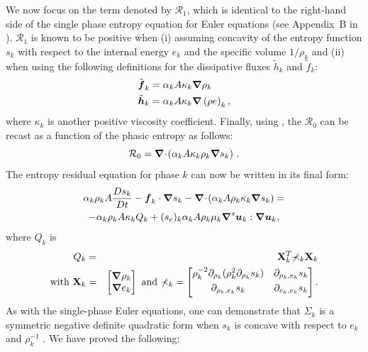We now focus on the term denoted by $\mathcal{R}_1$, which is identical to the right-hand side of the single phase entropy 
equation for Euler equations (see Appendix~B in \cite{Marco_paper_low_mach}). $\mathcal{R}_1$ is known to be positive when 
(i) assuming concavity of the entropy function $s_k$ with respect to the internal energy $e_k$ and the specific 
volume $1 / \rho_k$ and (ii) when using the following definitions for the dissipative fluxes $\tilde{h}_k$ and $\tilde{f}_k$:
%
\begin{subequations} \label{eq:def_visc}
\begin{align}
&\tilde{\boldsymbol f}_k = \alpha_k A \kappa_k \boldsymbol\nabla \rho_k \\
&\tilde{\boldsymbol h}_k = \alpha_k A \kappa_k \boldsymbol\nabla \left( \rho e \right)_k,
\end{align}
\end{subequations}
%  
where $\kappa_k$ is another positive viscosity coefficient. 
%
Finally, using , the $\mathcal{R}_0$ can be recast as a function of the phasic entropy as follows: 
%
\begin{equation}
\mathcal{R}_0 = \boldsymbol\nabla\! \cdot \! \left( \alpha_k A \kappa_k \rho_k \boldsymbol\nabla s_k \right) \,.
\end{equation}
%
The entropy residual equation for phase $k$ can now be written in its final form:
%
\begin{multline}\label{eq:ent-res-7-eqn-diss-terms3}
\alpha_k \rho_k A \frac{Ds_k}{Dt} -  \boldsymbol f_k \cdot \boldsymbol\nabla s_k - \boldsymbol\nabla\! \cdot \! \left( \alpha_k A \rho_k \kappa_k  \boldsymbol\nabla s_k \right) =  \\
- \alpha_k \rho_k A \kappa_k Q_k + (s_e)_k \alpha_k A \rho_k \mu_k \boldsymbol\nabla^s \boldsymbol u_k : \boldsymbol\nabla \boldsymbol u_k,
\end{multline}
%
where $Q_k$ is 
%
\begin{eqnarray}
Q_k &=& \mathbf{X}^T_k \mathbb{\Sigma}_k \mathbf{X}_k \nonumber \\
\text{with } \mathbf{X}_k &=& \begin{bmatrix}
\boldsymbol\nabla \rho_k \\
\boldsymbol\nabla e_k 
\end{bmatrix}
\text{ and } \mathbb{\Sigma}_k = \begin{bmatrix}
       \rho_k^{-2} \partial_{\rho_k} (\rho^2_k \partial_{\rho_k} s_k) & \partial_{\rho_k,e_k} s_k  \\[0.3em]
       \partial_{\rho_k,e_k} s_k & \partial_{e_k,e_k} s_k           \\[0.3em]
     \end{bmatrix}. \nonumber 
\end{eqnarray}
%
As with the single-phase Euler equations, one can demonstrate that $\mathbb{\Sigma}_k$ is a symmetric negative definite quadratic form 
when $s_k$ is concave with respect to $e_k$ and $\rho_k^{-1}$  \cite{jlg_VR_SIAM_2004,Marco_paper_low_mach}. We have proved the following:

